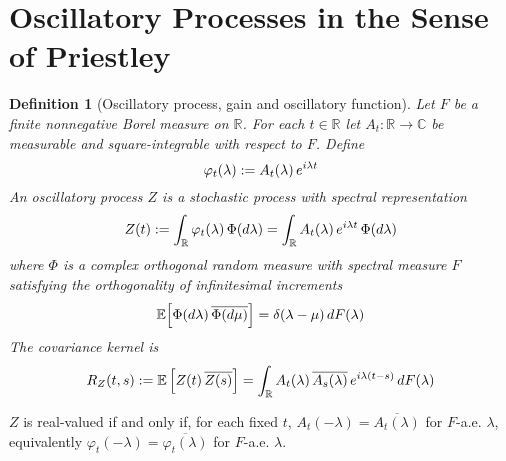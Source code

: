 \documentclass{article}
\newcommand{\assign}{:=}
\newcommand{\tmem}[1]{{\em #1\/}}
\newtheorem{definition}{Definition}
\begin{document}
\section{Oscillatory Processes in the Sense of Priestley}

\begin{definition}
  [Oscillatory process, gain and oscillatory function] Let $F$ be a finite
  nonnegative Borel measure on $\mathbb{R}$. For each $t \in \mathbb{R}$ let
  $A_t : \mathbb{R} \to \mathbb{C}$ be measurable and square-integrable with
  respect to $F$. Define
  \begin{equation}
    \varphi_t (\lambda) \assign A_t (\lambda)  \hspace{0.17em} e^{i \lambda t}
  \end{equation}
  An {\tmem{oscillatory process}} $Z$ is a stochastic process with spectral
  representation
  \begin{equation}
    Z (t) \assign \int_{\mathbb{R}} \varphi_t (\lambda)  \hspace{0.17em} \Phi
    (d \lambda) = \int_{\mathbb{R}} A_t (\lambda)  \hspace{0.17em} e^{i
    \lambda t}  \hspace{0.17em} \Phi (d \lambda)
  \end{equation}
  where $\Phi$ is a complex orthogonal random measure with spectral measure
  $F$ satisfying the orthogonality of infinitesimal increments
  \begin{equation}
    \mathbb{E} \hspace{-0.17em} \left[ \Phi (d \lambda) \hspace{0.17em}
    \overline{\Phi (d \mu)} \right] = \delta (\lambda - \mu)  \hspace{0.17em}
    dF (\lambda)
  \end{equation}
  The covariance kernel is
  \begin{equation}
    R_Z (t, s) \assign \mathbb{E} \left[ Z (t) \hspace{0.17em} \overline{Z
    (s)} \right] = \int_{\mathbb{R}} A_t (\lambda) \hspace{0.17em}
    \overline{A_s (\lambda)} \hspace{0.17em} e^{i \lambda (t - s)} 
    \hspace{0.17em} dF (\lambda)
  \end{equation}
\end{definition}

\begin{remark}
   $Z$ is real-valued if and only if, for each fixed $t$,
  $A_t  (- \lambda) = \overline{A_t (\lambda)}$ for $F$-a.e. $\lambda$,
  equivalently $\varphi_t  (- \lambda) = \overline{\varphi_t (\lambda)}$ for
  $F$-a.e. $\lambda$.
\end{remark}
\end{document}
